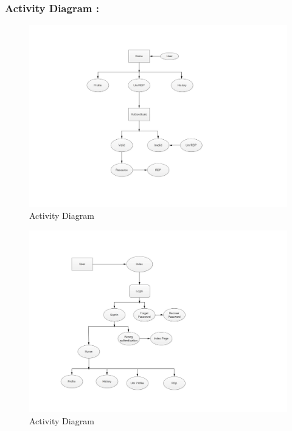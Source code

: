 \documentclass[12pt,a4paper,final,oneside]{report}
\begin{document}
	\subsubsection{Activity Diagram :}
\begin{figure}
		\centering	\includegraphics[width=1.0\linewidth,angle=0]
		{activity1.jpg}
		\caption{Activity Diagram}
	\end{figure}
	\begin{figure}
		\centering	\includegraphics[width=1.0\linewidth,angle=0]
		{activity2.jpg}
		\caption{Activity Diagram}
	\end{figure}
\end{document}
